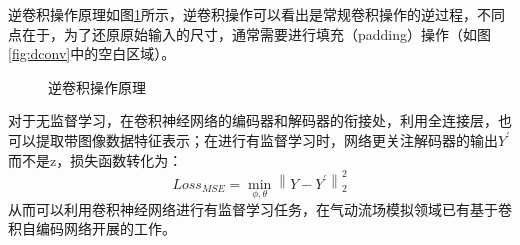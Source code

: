 逆卷积操作原理如图\ref{fig:conv_dconv}所示，逆卷积操作可以看出是常规卷积操作的逆过程，不同点在于，为了还原原始输入的尺寸，通常需要进行填充（padding）操作（如图\ref{fig:dconv}中的空白区域）。


\begin{figure}[htb]
	\centering
	 \qquad
	\caption{逆卷积操作原理}
	\label{fig:conv_dconv}
\end{figure}



对于无监督学习，在卷积神经网络的编码器和解码器的衔接处，利用全连接层，也可以提取带图像数据特征表示；在进行有监督学习时，网络更关注解码器的输出$Y^{\prime}$而不是z，损失函数转化为：
\begin{equation}
Loss_{MSE} = \min _{\phi, \theta}\left\|Y-Y^{\prime}\right\|_{2}^{2}
\end{equation}
从而可以利用卷积神经网络进行有监督学习任务，在气动流场模拟领域已有基于卷积自编码网络开展的工作\cite{DBLP:conf/kdd/GuoLI16}。



